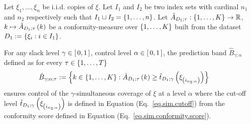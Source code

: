 \documentclass[11pt]{article}
\begin{document}
\begin{proposition}
\label{prop.make.it.sim}
Let $\xi_1, \ldots, \xi_{n}$ be i.i.d. copies of $\xi$.
Let $I_1$ and $I_2$ be two index sets with cardinal $n_1$ and $n_2$ respectively
such that $I_1 \sqcup I_2 = \left\{ 1, \ldots, n \right\}$.
%
%
%
Let $\hat{A}_{D_1; \tau} : \left\{ 1, \ldots, K \right\} \to \mathbb{R}$, $k \mapsto \hat{A}_{D_1; \tau} \left( k \right)$
be a conformity-measure over $\left\{ 1, \ldots, K \right\}$ built from the dataset $D_1 := \left\{ \xi_{i} : i \in I_1 \right\}$.
%
%
%

For any slack level $\gamma \in \left[\, 0, 1 \,\right]$, 
control level $\alpha \in \left[\, 0, 1 \,\right]$,
the prediction band $\hat{B}_{\gamma; \alpha}$ defined as for every $\tau \in \left\{ 1, \ldots, T \right\}$
\begin{align*}
    \hat{B}_{\gamma; \alpha; \tau}
    &
    := \left\{ 
        k \in \left\{ 1, \ldots, K \right\} : \hat{A}_{D_1; \tau} \left( k \right) \geq \hat{t}_{D_1; \gamma} \left( \xi_{\left( i_{n_2; \alpha} \right)} \right)
     \right\}
\end{align*}
ensures control of the $\gamma$-simultaneous coverage of $\xi$ at a level $\alpha$
where the cut-off level $\hat{t}_{D_1; \gamma} \left( \xi_{\left( i_{n_2; \alpha} \right)} \right)$
is defined in Equation (Eq.~\ref{eq.sim.cutoff}) from the conformity score defined in Equation (Eq.~\ref{eq.sim.conformity.score}).
\end{proposition}
%
%
%
\end{document}
